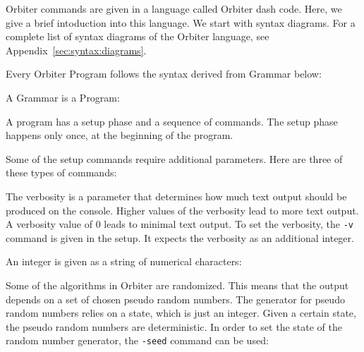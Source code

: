 Orbiter commands are given in a language called Orbiter dash code. 
Here, we give a brief intoduction into this language. 
We start with syntax diagrams. 
For a complete list of syntax diagrams of the Orbiter language, 
see Appendix~\ref{sec:syntax:diagrams}.



Every Orbiter Program follows the syntax derived from Grammar below:




A Grammar is a Program:



A program has a setup phase and a sequence of commands. 
The setup phase happens only once, 
at the beginning of the program. 



Some of the setup commands require additional parameters. 
Here are three of these types of commands:

\bigskip

The verbosity is a parameter that determines how much 
text output should be produced on the console. 
Higher values of the verbosity lead to more text output. 
A verbosity value of 0 leads to minimal text output.
To set the verbosity, 
the  \verb'-v' command is given in the setup. 
It expects the verbosity as an additional integer. 
 


\bigskip


An integer is given as a string of numerical characters:




\bigskip


Some of the algorithms in Orbiter are randomized. This means that the output depends on a set of chosen 
pseudo random numbers. The generator for pseudo random numbers relies on a state, which is just an integer. 
Given a certain state, the pseudo random numbers are deterministic. In order to set the state of the random number 
generator, the \verb'-seed' command can be used:



